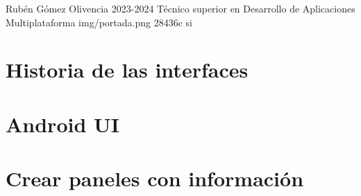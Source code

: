\documentclass{\ClassPath/yukibook}
\begin{document}
    {Rubén Gómez Olivencia}  %
    {2023-2024}    %
    {Técnico superior en \linebreak Desarrollo de  Aplicaciones Multiplataforma} %
    {}%
    {}%
    {img/portada.png} %
    {28436c}
    {si} %


    \coverpage
    \graphicspath{{../../../yukibook.cls/}}
    \licensepage

    \tableofcontents


    \part{Historia de las interfaces}
    \graphicspath{{./img/di/tema_1}}
    


    \part{Android UI}
    \graphicspath{{./img/di/tema_2}}
    


    \graphicspath{{./img/di/tema_3}}
    \part{Crear paneles con información}
    


%    
\end{document}
